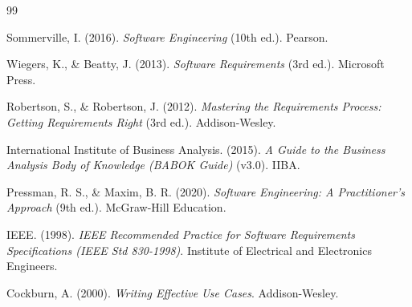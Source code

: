 \documentclass[11pt,a4paper]{article}
\begin{document}
\begin{thebibliography}{99}

	Sommerville, I. (2016).
	\textit{Software Engineering} (10th ed.).
	Pearson.

	Wiegers, K., \& Beatty, J. (2013).
	\textit{Software Requirements} (3rd ed.).
	Microsoft Press.

	Robertson, S., \& Robertson, J. (2012).
	\textit{Mastering the Requirements Process: Getting Requirements Right} (3rd ed.).
	Addison-Wesley.

	International Institute of Business Analysis. (2015).
	\textit{A Guide to the Business Analysis Body of Knowledge (BABOK Guide)} (v3.0).
	IIBA.

	Pressman, R. S., \& Maxim, B. R. (2020).
	\textit{Software Engineering: A Practitioner's Approach} (9th ed.).
	McGraw-Hill Education.

	IEEE. (1998).
	\textit{IEEE Recommended Practice for Software Requirements Specifications (IEEE Std 830-1998)}.
	Institute of Electrical and Electronics Engineers.

	Cockburn, A. (2000).
	\textit{Writing Effective Use Cases}.
	Addison-Wesley.

\end{thebibliography}
\end{document}

